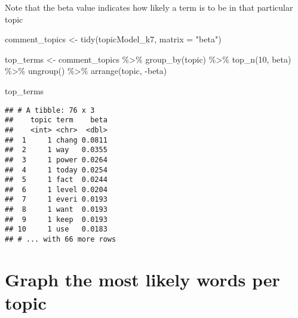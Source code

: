 \documentclass[
]{article}
\newenvironment{Shaded}{\begin{snugshade}}{\end{snugshade}}
\newcommand{\AttributeTok}[1]{\textcolor[rgb]{0.77,0.63,0.00}{#1}}
\newcommand{\DecValTok}[1]{\textcolor[rgb]{0.00,0.00,0.81}{#1}}
\newcommand{\FunctionTok}[1]{\textcolor[rgb]{0.00,0.00,0.00}{#1}}
\newcommand{\NormalTok}[1]{#1}
\newcommand{\OtherTok}[1]{\textcolor[rgb]{0.56,0.35,0.01}{#1}}
\newcommand{\SpecialCharTok}[1]{\textcolor[rgb]{0.00,0.00,0.00}{#1}}
\newcommand{\StringTok}[1]{\textcolor[rgb]{0.31,0.60,0.02}{#1}}
\begin{document}
\begin{Shaded}
\end{Shaded}

Note that the beta value indicates how likely a term is to be in that
particular topic

\begin{Shaded}
\begin{Highlighting}[]
\NormalTok{comment\_topics }\OtherTok{\textless{}{-}} \FunctionTok{tidy}\NormalTok{(topicModel\_k7, }\AttributeTok{matrix =} \StringTok{"beta"}\NormalTok{)}

\NormalTok{top\_terms }\OtherTok{\textless{}{-}}\NormalTok{ comment\_topics }\SpecialCharTok{\%\textgreater{}\%}
  \FunctionTok{group\_by}\NormalTok{(topic) }\SpecialCharTok{\%\textgreater{}\%}
  \FunctionTok{top\_n}\NormalTok{(}\DecValTok{10}\NormalTok{, beta) }\SpecialCharTok{\%\textgreater{}\%}
  \FunctionTok{ungroup}\NormalTok{() }\SpecialCharTok{\%\textgreater{}\%}
  \FunctionTok{arrange}\NormalTok{(topic, }\SpecialCharTok{{-}}\NormalTok{beta)}

\NormalTok{top\_terms}
\end{Highlighting}
\end{Shaded}

\begin{verbatim}
## # A tibble: 76 x 3
##    topic term    beta
##    <int> <chr>  <dbl>
##  1     1 chang 0.0811
##  2     1 way   0.0355
##  3     1 power 0.0264
##  4     1 today 0.0254
##  5     1 fact  0.0244
##  6     1 level 0.0204
##  7     1 everi 0.0193
##  8     1 want  0.0193
##  9     1 keep  0.0193
## 10     1 use   0.0183
## # ... with 66 more rows
\end{verbatim}

\hypertarget{graph-the-most-likely-words-per-topic}{%
\section{Graph the most likely words per
topic}\label{graph-the-most-likely-words-per-topic}}
\end{document}
